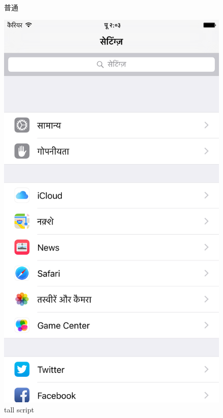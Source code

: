 \begin{figure}[htbp]
\begin{minipage}{0.5\hsize}
\begin{center}
        \end{center}
        \caption{普通}
    \end{minipage}
    \begin{minipage}{0.5\hsize}
        \begin{center}
            \includegraphics[width=\linewidth]{images/ios_preferences_tall.png}
        \end{center}
        \caption{tall script}
    \end{minipage}
\end{figure}

